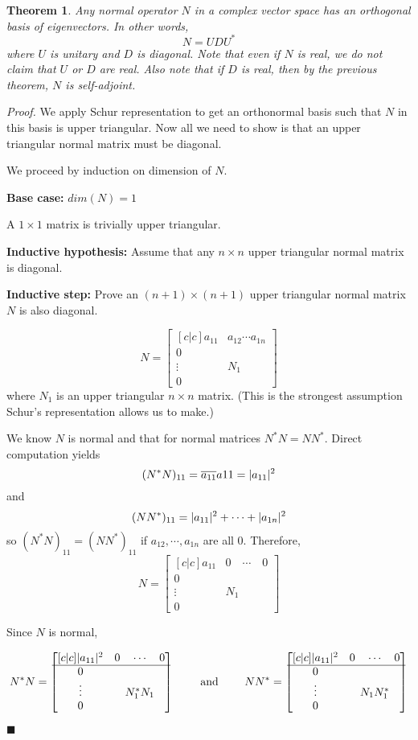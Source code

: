 \documentclass[a4paper,10pt]{book}
\theoremstyle{plain}
\newtheorem{theorem}{Theorem}[section]
\renewenvironment{proof}{\textsl{Proof.}}{\hfill$\blacksquare$}
\theoremstyle{plain}
\theoremstyle{definition}
\begin{document}
\begin{theorem}
Any normal operator $N$ in a complex vector space has an orthogonal basis of eigenvectors. In other words, 
$$N = UDU^{*}$$
where $U$ is unitary and $D$ is diagonal. Note that even if $N$ is real, we do not claim that $U$ or $D$ are real. Also note that if $D$ is real, then by the previous theorem, $N$ is self-adjoint. 
\end{theorem}

\begin{proof}
We apply Schur representation to get an orthonormal basis such that $N$ in this basis is upper triangular. Now all we need to show is that an upper triangular normal matrix must be diagonal. 

We proceed by induction on dimension of $N$. 

\textbf{Base case: } $dim(N) = 1$

A $1 \times 1$ matrix is trivially upper triangular. 

\textbf{Inductive hypothesis: } Assume that any $n \times n$ upper triangular normal matrix is diagonal. 

\textbf{Inductive step: } Prove an $(n+1) \times (n+1)$ upper triangular normal matrix $N$ is also diagonal. 

$$N = \begin{bmatrix}[c|c]
a_{11} & a_{12} \cdots a_{1n} \\
\hline
0 & \\
\vdots & N_{1} \\
0 & 
\end{bmatrix}$$
where $N_{1}$ is an upper triangular $n \times n$ matrix. (This is the strongest assumption Schur's representation allows us to make.)

We know $N$ is normal and that for normal matrices $N^{*}N = NN^{*}$. Direct computation yields 
$$(N^{*} N)_{11} = \overline{a_{11}} a{11} = \lvert a_{11}\rvert^{2}$$
and 
$$(NN^{*})_{11} = \lvert a_{11}\rvert^{2} + \cdots + \lvert a_{1n}\rvert^{2}$$
so $(N^{*}N)_{11} = (NN^{*})_{11}$ if $a_{12}, \cdots, a_{1n}$ are all 0. Therefore, 
$$N = \begin{bmatrix}[c|c]
a_{11} & 0 \quad \cdots \quad 0 \\
\hline
0 & \\
\vdots & N_{1} \\
0 & 
\end{bmatrix}$$

Since $N$ is normal, 

$$N^{*}N = \begin{bmatrix}[c|c]
\lvert a_{11}\rvert^{2} & 0 \quad \cdots \quad 0 \\
\hline
0 & \\
\vdots & N_{1}^{*} N_{1} \\
0 & 
\end{bmatrix} \qquad \text{ and } \qquad NN^{*} = \begin{bmatrix}[c|c]
\lvert a_{11}\rvert^{2} & 0 \quad \cdots \quad 0 \\
\hline
0 & \\
\vdots & N_{1} N_{1}^{*} \\
0 & 
\end{bmatrix}$$


\end{proof}
\end{document}
